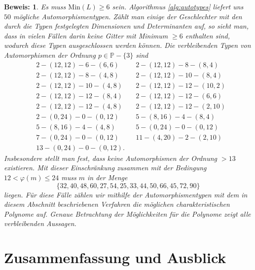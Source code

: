 \documentclass[12pt,a4paper,halfparskip,headsepline,bibtotocnumbered]{scrreprt}
\theoremstyle{nummermitklammern}
\theoremstyle{nonumberbreak}
\newtheorem{beweis}{Beweis:}
\renewcommand{\P}{\mathbb{P}}
\newcommand{\Min}{\text{Min}}
\begin{document}
\begin{beweis}
	Es muss $\Min(L) \ge 6$ sein. Algorithmus \eqref{alg:autotypes} liefert uns $50$ mögliche Automorphismentypen. Zählt man einige der Geschlechter mit den durch die Typen festgelegten Dimensionen und Determinanten auf, so sieht man, dass in vielen Fällen darin keine Gitter mit Minimum $\geq 6$ enthalten sind, wodurch diese Typen ausgeschlossen werden können. Die verbleibenden Typen von Automorphismen der Ordnung $p \in \P - \lbrace 3 \rbrace$  sind
	\begin{align*}
		&2 - (12, 12) - 6 - (6, 6)		&&2 - (12, 12) - 8 - (8,4)\\
		&2 - (12, 12) - 8 - (4, 8)		&&2 - (12, 12) - 10 - (8, 4)	\\
		&2 - (12, 12) - 10 - (4,8)		&&2 - (12, 12) - 12 - (10, 2)\\
		&2 - (12, 12) - 12 - (8, 4)		&&2 - (12, 12) - 12 - (6, 6)\\
		&2 - (12, 12) - 12 - (4, 8)		&&2 - (12, 12) - 12 - (2, 10)\\
		&2 - (0, 24) - 0 - (0, 12)		&&5 - (8, 16) - 4 - (8, 4)\\
		&5 - (8, 16) - 4 - (4, 8)		&&5 - (0, 24) - 0 - (0, 12)	\\
		&7 - (0, 24) - 0 - (0, 12)		&&11 - (4, 20) - 2 - (2, 10)\\
		&13 - (0, 24) - 0 - (0, 12).
	\end{align*}
	Insbesondere stellt man fest, dass keine Automorphismen der Ordnung $>13$ existieren. Mit dieser Einschränkung zusammen mit der Bedingung $12 < \varphi(m) \leq 24$ muss $m$ in der Menge
	\begin{equation*}
		\lbrace 32, 40, 48, 60, 27, 54, 25, 33, 44, 50, 66, 45, 72, 90\rbrace
	\end{equation*}
	liegen. Für diese Fälle zählen wir mithilfe der Automorphismentypen mit dem in diesem Abschnitt beschriebenen Verfahren die möglichen charakteristischen Polynome auf. Genaue Betrachtung der Möglichkeiten für die Polynome zeigt alle verbleibenden Aussagen. 
\end{beweis}

\section{Zusammenfassung und Ausblick}
\end{document}

